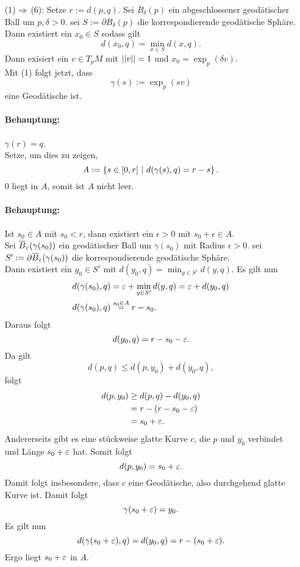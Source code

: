 \begin{Beweis}{}
\begin{enumerate}
	\item[(1) $\overset{}{\Rightarrow}$ (6):] Setze $r := d(p,q)$. Sei $\overline{B}_\delta(p)$ ein abgeschlossener geodätischer Ball um $p, \delta > 0$. sei $S := \partial \overline{B}_\delta(p)$ die korrespondierende geodätische Sphäre. Dann existiert ein $x_0 \in S$ sodass gilt
	\[ d(x_0, q) = \min_{x \in S} d(x,q). \]
	Dann exisiert ein $v \in T_pM$ mit $\left|\left|v\right|\right| = 1$ und $x_0 = \exp_p(\delta v)$.\\
	Mit (1) folgt jetzt, dass
	\[ \gamma(s):= \exp_p(sv) \]
	eine Geodätische ist.
	\paragraph{Behauptung:} $\gamma(r) = q$.\\
	Setze, um dies zu zeigen, 
	\[ A:= \set{s \in [0,r]}{ d(\gamma(s),q) = r-s }. \]
	0 liegt in $A$, somit ist $A$ nicht leer.
	\paragraph{Behauptung:} Ist $s_0\in A$ mit $s_0<r$, dann existiert ein $\epsilon > 0$ mit $s_0 + \epsilon \in A$.\\
	Sei $\overline{B}_\varepsilon(\gamma(s_0))$ ein geodätischer Ball um $\gamma(s_0)$ mit Radius $\epsilon > 0$. sei
	$S':= \partial \overline{B}_\varepsilon (\gamma(s_0)) $ die korrespondierende geodätische Sphäre.\\
	Dann existiert ein $y_0 \in S'$ mit $d(y_0, q) = \min_{y\in S'} d(y,q)$. Es gilt nun
	\begin{align*}
	d(\gamma(s_0), q) &= \varepsilon + \min_{y\in S'} d(y,q) = \varepsilon + d(y_0, q)\\
	d(\gamma(s_0), q) &\overset{s_0 \in A}{=} r - s_0.
	\end{align*}
	Daraus folgt
	\[ d(y_0, q) = r - s_0 - \varepsilon. \]
	Da gilt
	\[ d(p,q) \leq d(p,y_0) + d(y_0,q), \]
	 folgt
	 \begin{align*}
	 d(p,y_0) &\geq d(p,q) - d(y_0, q)\\
	 &= r - (r - s_0 - \varepsilon)\\
	 &= s_0+\varepsilon.
	 \end{align*}
	 Andererseits gibt es eine stückweise glatte Kurve $c$, die $p$ und $y_0$ verbindet und Länge $s_0 + \varepsilon$ hat. Somit folgt
	 \[ d(p, y_0) = s_0 + \varepsilon. \]
	 Damit folgt insbesondere, dass $c$ eine Geodätische, also durchgehend glatte Kurve ist. Damit folgt
	 \[ \gamma(s_0 + \varepsilon) = y_0. \]
	 Es gilt nun
	 \[ d(\gamma(s_0+\varepsilon), q) = d(y_0, q) = r - (s_0 + \varepsilon). \]
	 Ergo liegt $s_0 + \varepsilon$ in $A$.\\
	 

\end{enumerate}
\end{Beweis}
